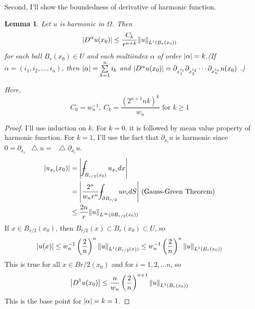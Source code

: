 \documentclass{article}
\newcommand*\Laplace{\mathop{}\!\mathbin\bigtriangleup}
\newtheorem{lemma}{Lemma}
\def\Xint#1{\mathchoice
{\XXint\displaystyle\textstyle{#1}}%
{\XXint\textstyle\scriptstyle{#1}}%
{\XXint\scriptstyle\scriptscriptstyle{#1}}%
{\XXint\scriptscriptstyle\scriptscriptstyle{#1}}%
\!\int}
\def\XXint#1#2#3{{\setbox0=\hbox{$#1{#2#3}{\int}$ }
\vcenter{\hbox{$#2#3$ }}\kern-.6\wd0}}
\def\dashint{\Xint-}
\begin{document}
\begin{enumerate}
Second, I'll show the boundedness of derivative of harmonic function.
\begin{lemma}\label{Lemma6-1}
Let $u$ is harmonic in $\Omega$. Then
\begin{equation*}
\abs{D^\alpha u(x_0)}\leq \frac{C_k}{r^{n+k}}\norm{u}_{L^1(B_r(x_0))}
\end{equation*}
for each ball $B_r(x_0)\in U$ and each multiindex $\alpha$ of order $\abs{\alpha}=k$.(If $\alpha=(i_1,i_2,\ldots,i_n)$, then $\abs{\alpha}=\sum\limits_{k=1}^n i_k$ and $\abs{D^\alpha u(x_0)}=\partial_{x_1^{i_1}}\partial_{x_2^{i_2}}\cdots \partial_{x_n^{i_n}} u(x_0)$ .)

Here,
\begin{equation*}
C_0=w_n^{-1},~C_k=\frac{(2^{n+1}nk)^k}{w_n}\text{ for }k\geq 1
\end{equation*}
\end{lemma}

\begin{proof}
I'll use induction on $k$. For $k=0$, it is followed by mean value property of harmonic function. For $k=1$, I'll use the fact that $\partial_{x_i} u$ is harmonic since $0=\partial_{x_i} \Laplace u=\Laplace \partial_{x_i} u$.
\begin{equation*}
\begin{split}
\abs{u_{x_i}(x_0)}&=\abs{\dashint_{B_{r/2}(x_0)}u_{x_i}dx}\\
&=\abs{\frac{2^n}{w_n r^n}\dashint_{\partial B_{r/2}}u\nu_i dS}\text{ (Gauss-Green Theorem)}\\
&\leq \frac{2n}{r}\norm{u}_{L^\infty(\partial B_{r/2}(x_0))}
\end{split}
\end{equation*}
If $x\in B_{r/2}(x_0)$, then $B_{r/2}(x)\subset B_r(x_0)\subset U$, so
\begin{equation*}
\abs{u(x)}\leq w^{-1}_n\left(\frac{2}{n}\right)^n \norm{u}_{L^1(B_{r/2}(x))}\leq w^{-1}_n\left(\frac{2}{n}\right)^n \norm{u}_{L^1(B_{r}(x_0))}
\end{equation*}
This is true for all $x\in B{r/2}(x_0)$ and for $i=1,2,\ldots n$, so
\begin{equation*}
\abs{D^1 u(x_0)}\leq \frac{n}{w_n}\left(\frac{2}{n}\right)^{n+1}\norm{u}_{L^1(B_r(x_0))}
\end{equation*}
This is the base point for $\abs{\alpha}=k=1$.


\end{proof}
\end{enumerate}
\end{document}
